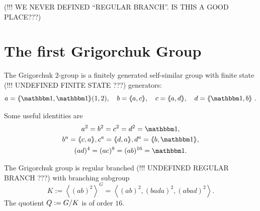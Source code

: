 \documentclass[a4paper,11pt]{amsart}
\begin{document}
(!!! WE NEVER DEFINED ``REGULAR BRANCH''. IS THIS A GOOD PLACE???)

\section{The first Grigorchuk Group}\label{sec:GrigorchukGroup}
The Grigorchuk $2$-group is a finitely generated self-similar group with finite state (!!! UNDEFINED FINITE STATE ???) generators:
\[a=\pair{\id,\id}(1,2),\quad b=\pair{a,c},\quad c=\pair{a,d},\quad d=\pair{\id,b}\ . \]

Some useful identities are
\begin{gather*}
  a^2=b^2=c^2=d^2=\id,\\
  b^a= \pair{c,a}, c^a=\pair{d,a}, d^a=\pair{b,\id},\\
  (ad)^4=(ac)^8=(ab)^{16}= \id.
\end{gather*}

\begin{lem}\label{lem:subgroupK}
The Grigorchuk group is regular branched (!!! UNDEFINED REGULAR BRANCH ???) with branching subgroup 
 \[K:= \left<(ab)^2\right>^G=\left< (ab)^2,(bada)^2,(abad)^2 \right>. \]
 The quotient $Q := {G/K}$ is of order $16$.
\end{lem}
\end{document}
